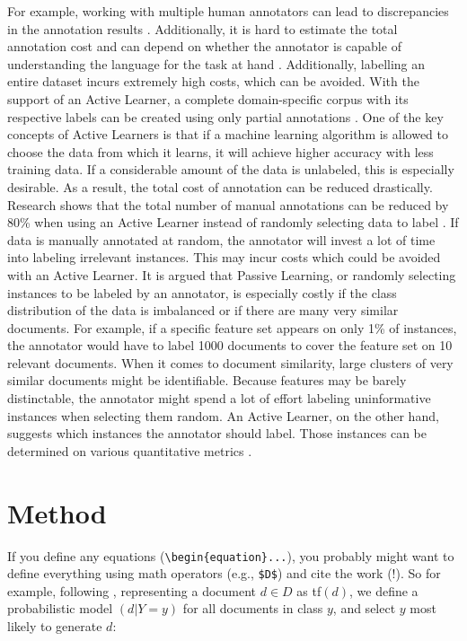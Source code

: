 \documentclass[11pt, a4paper]{article}
\begin{document}
For example, working with multiple human annotators can lead to discrepancies in the annotation results \citep{kim2008corpusannotation}. 
Additionally, it is hard to estimate the total annotation cost and can depend on whether the annotator is capable of understanding 
the language for the task at hand \citep{arora2009estimationgannotationcost}. Additionally, labelling an entire dataset incurs extremely high costs, 
which can be avoided. With the support of an Active Learner, a complete domain-specific corpus with its respective labels can be 
created using only partial annotations \citep{park2015EfficientExtractionOfDomain}. 
One of the key concepts of Active Learners is that if a machine learning algorithm is allowed to choose the data from which it learns, 
it will achieve higher accuracy with less training data. If a considerable amount of the data is unlabeled, this is especially desirable. 
As a result, the total cost of annotation can be reduced drastically. Research shows that the total number of 
manual annotations can be reduced by 80\% when using an Active Learner instead of randomly 
selecting data to label \citep{baldridgeosborne2004active}.
If data is manually annotated at random, the annotator will invest a lot of time into labeling irrelevant instances. 
This may incur costs which could be avoided with an Active Learner. It is argued that Passive Learning, or randomly selecting instances 
to be labeled by an annotator, is especially costly if the class distribution of the data is imbalanced or if there are many very similar documents. 
For example, if a specific feature set appears on only 1\% of instances, the annotator would have to label 1000 documents to cover 
the feature set on 10 relevant documents. When it comes to document similarity, large clusters of very similar documents might be 
identifiable. Because features may be barely distinctable, the annotator might spend a lot of effort labeling uninformative instances 
when selecting them random. An Active Learner, on the other hand, suggests which instances the annotator should label. Those instances can be 
determined on various quantitative metrics \citep{miller2020activelearningapproaches}.

\section{Method}

If you define any equations (\verb|\begin{equation}...|), you probably might want to define everything using math operators (e.g., \verb|$D$|) and cite the work (!). So for example, following , representing a document $d \in D$ as tf$(d)$, we define a probabilistic model $(d | Y = y)$ for all documents in class $y$, and select $y$ most likely to generate $d$:
\end{document}
